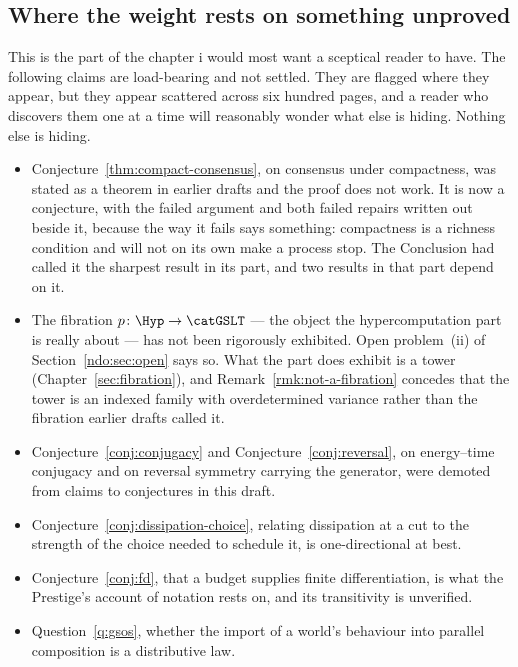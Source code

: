\subsection*{Where the weight rests on something unproved}

This is the part of the chapter i would most want a sceptical
reader to have.
The following claims are load-bearing and not settled.
They are flagged where they appear, but they appear scattered
across six hundred pages, and a reader who discovers them one at a
time will reasonably wonder what else is hiding.
Nothing else is hiding.

\begin{itemize}[leftmargin=1.6em, itemsep=4pt]
\item Conjecture~\ref{thm:compact-consensus}, on consensus under
      compactness, was stated as a theorem in earlier drafts and the
      proof does not work.
      It is now a conjecture, with the failed argument and both
      failed repairs written out beside it, because the way it fails
      says something: compactness is a richness condition and will
      not on its own make a process stop.
      The Conclusion had called it the sharpest result in its part,
      and two results in that part depend on it.
\item The fibration $p\colon\Hyp\to\catGSLT$ --- the object the
      hypercomputation part is really about --- has not been
      rigorously exhibited.
      Open problem~(ii) of Section~\ref{ndo:sec:open} says so.
      What the part does exhibit is a tower
      (Chapter~\ref{sec:fibration}), and
      Remark~\ref{rmk:not-a-fibration} concedes that the tower is an
      indexed family with overdetermined variance rather than the
      fibration earlier drafts called it.
\item Conjecture~\ref{conj:conjugacy} and
      Conjecture~\ref{conj:reversal}, on energy--time conjugacy
      and on reversal symmetry carrying the generator, were
      demoted from claims to conjectures in this draft.
\item Conjecture~\ref{conj:dissipation-choice}, relating
      dissipation at a cut to the strength of the choice needed to
      schedule it, is one-directional at best.
\item Conjecture~\ref{conj:fd}, that a budget supplies finite
      differentiation, is what the Prestige's account of notation
      rests on, and its transitivity is unverified.
\item Question~\ref{q:gsos}, whether the import of a world's
      behaviour into parallel composition is a distributive law.

\end{itemize}
